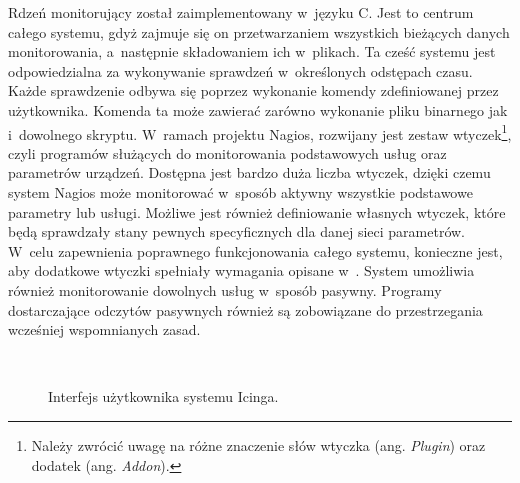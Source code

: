 Rdzeń monitorujący został zaimplementowany w~języku C. Jest to centrum
całego systemu, gdyż zajmuje się on przetwarzaniem wszystkich
bieżących danych monitorowania, a~następnie składowaniem ich
w~plikach. Ta cześć systemu jest odpowiedzialna za wykonywanie
sprawdzeń w~określonych odstępach czasu. Każde sprawdzenie odbywa się
poprzez wykonanie komendy zdefiniowanej przez użytkownika. Komenda ta
może zawierać zarówno wykonanie pliku binarnego jak i~dowolnego
skryptu. W~ramach projektu Nagios, rozwijany jest zestaw
wtyczek\footnote{Należy zwrócić uwagę na różne znaczenie słów wtyczka
  (ang. {\em Plugin}) oraz dodatek (ang. {\em Addon}). }, czyli
programów służących do monitorowania podstawowych usług oraz
parametrów urządzeń. Dostępna jest bardzo duża liczba wtyczek, dzięki
czemu system Nagios może monitorować w~sposób aktywny wszystkie
podstawowe parametry lub usługi. Możliwe jest również definiowanie
własnych wtyczek, które będą sprawdzały stany pewnych specyficznych
dla danej sieci parametrów. W~celu zapewnienia poprawnego
funkcjonowania całego systemu, konieczne jest, aby dodatkowe wtyczki
spełniały wymagania opisane w~\cite{www:NagiosPluginsTutorial}. System
umożliwia również monitorowanie dowolnych usług w~sposób
pasywny. Programy dostarczające odczytów pasywnych również są
zobowiązane do przestrzegania wcześniej wspomnianych zasad.

\begin{figure}[h]
\label{fig:NagiosInterface}
\caption{Interfejs użytkownika systemu Icinga.}
\begin{center}
\\[0.1cm]
\end{center}
\end{figure}

